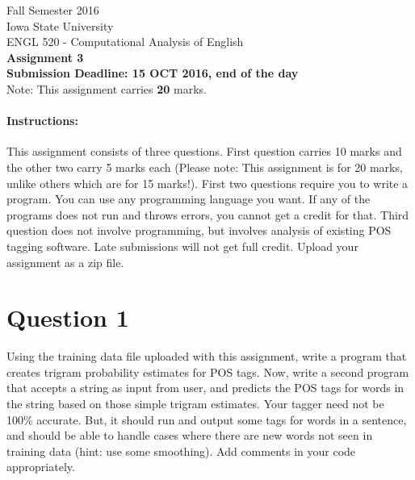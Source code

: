 \documentclass[11pt,a4paper]{article}
\begin{document}
\begin{center}
  Fall Semester 2016 \\ Iowa State University\\[3ex]
  {\large ENGL 520 - Computational Analysis of English}\\[3ex]
  \textbf{Assignment 3} \\ \textbf{Submission Deadline: 15 OCT 2016, end of the day}
  \\ Note: This assignment carries \textbf{20} marks. 
\end{center}


\paragraph{Instructions:} This assignment consists of three questions. First question carries 10 marks and the other two carry 5 marks each (Please note: This assignment is for 20 marks, unlike others which are for 15 marks!).  First two questions require you to write a program. You can use any programming language you want. If any of the programs does not run and throws errors, you cannot get a credit for that. Third question does not involve programming, but involves analysis of existing POS tagging software. Late submissions will not get full credit. Upload your assignment as a zip file.

\section*{Question 1}
Using the training data file uploaded with this assignment, write a program that creates trigram probability estimates for POS tags. Now, write a second program that accepts a string as input from user, and predicts the POS tags for words in the string based on those simple trigram estimates. Your tagger need not be 100\% accurate. But, it should run and output some tags for words in a sentence, and should be able to handle cases where there are new words not seen in training data (hint: use some smoothing). Add comments in your code appropriately. 
\end{document}
